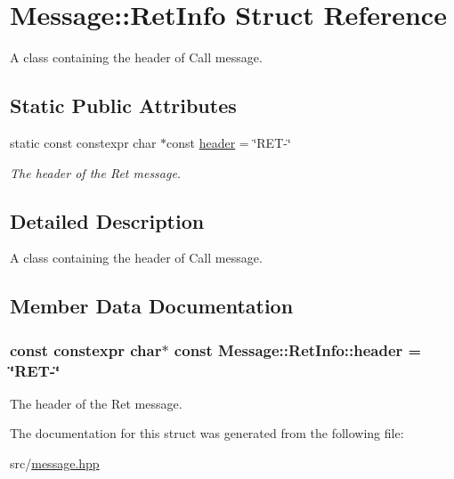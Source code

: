 \hypertarget{struct_message_1_1_ret_info}{\section{Message\-:\-:Ret\-Info Struct Reference}
\label{struct_message_1_1_ret_info}
}


A class containing the header of Call message.  


\subsection*{Static Public Attributes}
\begin{DoxyCompactItemize}
\item 
static const constexpr char $\ast$const \hyperlink{struct_message_1_1_ret_info_a15d17cb758011b5e1b787a416ec8c32a}{header} = \char`\"{}R\-E\-T-\/\char`\"{}
\begin{DoxyCompactList}\small\item\em The header of the Ret message. \end{DoxyCompactList}\end{DoxyCompactItemize}


\subsection{Detailed Description}
A class containing the header of Call message. 

\subsection{Member Data Documentation}
\hypertarget{struct_message_1_1_ret_info_a15d17cb758011b5e1b787a416ec8c32a}{
\subsubsection[{header}]{\setlength{\rightskip}{0pt plus 5cm}const constexpr char$\ast$ const Message\-::\-Ret\-Info\-::header = \char`\"{}R\-E\-T-\/\char`\"{}\hspace{0.3cm}{\ttfamily [static]}}}\label{struct_message_1_1_ret_info_a15d17cb758011b5e1b787a416ec8c32a}


The header of the Ret message. 



The documentation for this struct was generated from the following file\-:\begin{DoxyCompactItemize}
\item 
src/\hyperlink{message_8hpp}{message.\-hpp}\end{DoxyCompactItemize}
